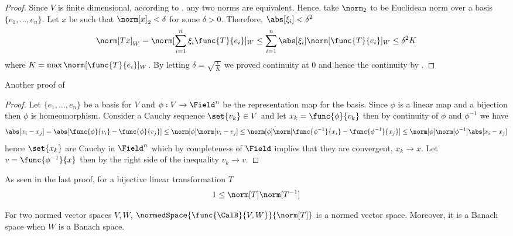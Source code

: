 \begin{proof}
    Since \(V\) is finite dimensional, according to , any two norms are equivalent. Hence, take \(\norm_2\) to be Euclidean norm over a basis \(\{e_1, \dots , e_n\}\). Let \(x\) be such that \(\norm[x]_2 < \delta\) for some \(\delta > 0\). Therefore, \(\abs[\xi_i] < \delta^2\)
    \begin{equation*}
        \norm[Tx]_W = \norm[\sum_{i = 1}^n \xi_i \func{T}{e_i}]_W \leq \sum_{i = 1}^n \abs[\xi_i] \norm[\func{T}{e_i}]_W \leq \delta^2 K
    \end{equation*}
    where \(K = \max \norm[\func{T}{e_i}]_W \). By letting \(\delta = \sqrt{\frac{\epsilon}{K}}\) we proved continuity at \(0\) and hence the continuity by .
\end{proof}

Another proof of 

\begin{proof}
    Let \(\{e_1, \dots , e_n\}\) be a basis for \(V\) and \(\phi : V \to \Field^n\) be the representation map for the basis. Since \(\phi\) is a linear map and a bijection then \(\phi\) is homeomorphism. Consider a Cauchy sequence \(\set{v_k} \in V\) and let \(x_k = \func{\phi}{v_k}\) then by continuity of \(\phi\) and \(\phi^{-1}\) we have
    \begin{equation*}
        \abs[x_i - x_j] = \abs[\func{\phi}{v_i} - \func{\phi}{v_j}] \leq \norm[\phi] \norm[v_i - v_j] \leq \norm[\phi] \norm[\func{\phi^{-1}}{x_i} - \func{\phi^{-1}}{x_j}] \leq \norm[\phi] \norm[\phi^{-1}] \abs[x_i - x_j]
    \end{equation*}
    hence \(\set{x_k}\) are Cauchy in \(\Field^n\) which by completeness of \(\Field\) implies that they are convergent, \(x_k \to x\). Let \(v = \func{\phi^{-1}}{x}\) then by the right side of the inequality \(v_k \to v\).
\end{proof}

\begin{remark}
    As seen in the last proof, for a bijective linear transformation \(T\)
    \begin{equation*}
        1 \leq \norm[T] \norm[T^{-1}]
    \end{equation*}
\end{remark}

\begin{theorem}
    For two normed vector spaces \(V,W\), \(\normedSpace{\func{\CalB}{V,W}}{\norm[T]}\) is a normed vector space. Moreover, it is a Banach space when \(W\) is a Banach space.
\end{theorem}


